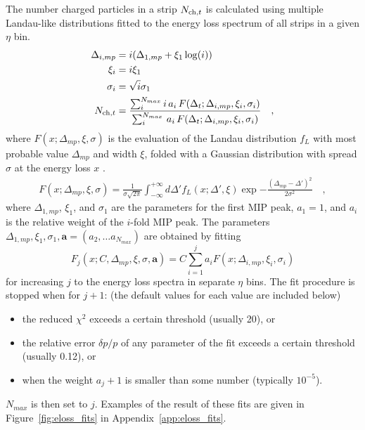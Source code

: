 \documentclass[11pt]{article}
\newcommand{\mult}[1][]{\ensuremath N_{\text{ch}#1}}
\newcommand{\figref}[1]{Figure~\ref{#1}}
\begin{document}
The number charged particles in a strip $\mult[,t]$ is calculated
using multiple Landau-like distributions fitted to the energy loss
spectrum of all strips in a given $\eta$ bin.
\begin{align}
  \Delta_{i,mp} &= i (\Delta_{1,mp}+ \xi_1 \log(i))\nonumber\\
  \xi_i         &= i\xi_1\nonumber\\
  \sigma_i      &= \sqrt{i}\sigma_1\nonumber\\
  \mult[,t]     &= \frac{\sum_i^{N_{max}}
    i\,a_i\,F(\Delta_t;\Delta_{i,mp},\xi_i,\sigma_i)}{
    \sum_i^{N_{max}}\,a_i\,F(\Delta_t;\Delta_{i,mp},\xi_i,\sigma_i)}\quad,
\end{align}
where $F(x;\Delta_{mp},\xi,\sigma)$ is the evaluation of the Landau
distribution $f_L$ with most probable value $\Delta_{mp}$ and width
$\xi$, folded with a Gaussian distribution with spread $\sigma$ at the
energy loss $x$ \cite{nim:b1:16,phyrev:a28:615}.
\begin{align}
  \label{eq:energy_response}
  F(x;\Delta_{mp},\xi,\sigma) = \frac{1}{\sigma \sqrt{2 \pi}}
  \int_{-\infty}^{+\infty} d\Delta' f_{L}(x;\Delta',\xi)
  \exp{-\frac{(\Delta_{mp}-\Delta')^2}{2\sigma^2}}\quad,
\end{align}
where $\Delta_{1,mp}$, $\xi_1$, and $\sigma_1$ are the parameters for
the first MIP peak, $a_1=1$, and $a_i$ is the relative weight of the
$i$-fold MIP peak.  The parameters $\Delta_{1,mp}, \xi_1,
\sigma_1, \mathbf{a} = \left(a_2, \ldots a_{N_{max}}\right)$ are
obtained by fitting 
$$
F_j(x;C,\Delta_{mp},\xi,\sigma,\mathbf{a}) = C 
\sum_{i=1}^{j} a_i F(x;\Delta_{i,mp},\xi_{i},\sigma_i) 
$$
for increasing $j$ to the energy loss spectra in separate $\eta$ bins.
The fit procedure is stopped when for $j+1$: (the default values for
each value are included below) 
\begin{itemize}
\item the reduced $\chi^2$ exceeds a certain threshold (usually 20), or
\item the relative error $\delta p/p$ of any parameter of the fit
  exceeds a certain threshold (usually 0.12), or 
\item when the weight $a_j+1$ is smaller than some number (typically
  $10^{-5}$). 
\end{itemize}
$N_{max}$ is then set to $j$.  Examples of the result of these fits
are given in \figref{fig:eloss_fits} in Appendix~\ref{app:eloss_fits}.
\end{document}
